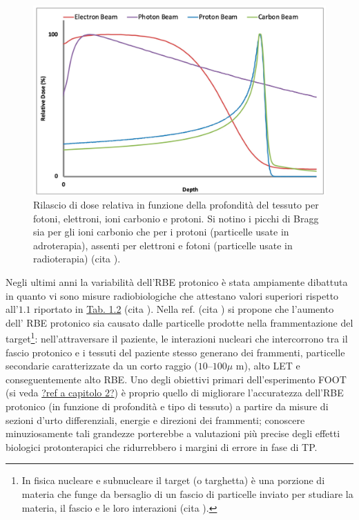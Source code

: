 \documentclass[12pt,a4paper,twoside]{report}
\begin{document}
	\begin{figure}[H]
		\centering
		\includegraphics[width=0.9\linewidth]{photon.jpg}
		\caption{Rilascio di dose relativa in funzione della profondità del tessuto per fotoni, elettroni, ioni carbonio e protoni. Si notino i picchi di Bragg sia per gli ioni carbonio che per i protoni (particelle usate in adroterapia), assenti per elettroni e fotoni (particelle usate in radioterapia) (cita
			).}
		\label{fig:photon}
	\end{figure}
	
	Negli ultimi anni la variabilità dell'RBE protonico è stata ampiamente dibattuta in quanto vi sono misure radiobiologiche che attestano valori superiori rispetto all'$1.1$ riportato in \hyperref[tab:let_rbe]{Tab. 1.2} (cita
	). Nella ref. (cita
	) si propone che l'aumento dell' RBE protonico sia causato dalle particelle prodotte nella frammentazione del target\footnote{In fisica nucleare e subnucleare il target (o targhetta) è una porzione di materia che funge da bersaglio di un fascio di particelle inviato per studiare la materia, il fascio e le loro interazioni (cita
		).}: nell'attraversare il paziente, le interazioni nucleari che intercorrono tra il fascio protonico e i tessuti del paziente stesso generano dei frammenti, particelle secondarie caratterizzate da un corto raggio ($10$--$100\mu\mbox{ m}$), alto LET e conseguentemente alto RBE. Uno degli obiettivi primari dell'esperimento FOOT (si veda \hyperref[ref a capitolo 2]{?ref a capitolo 2?}) è proprio quello di migliorare l'accuratezza dell'RBE protonico (in funzione di profondità e tipo di tessuto) a partire da misure di sezioni d'urto differenziali, energie e direzioni dei frammenti; conoscere minuziosamente tali grandezze porterebbe a valutazioni più precise degli effetti biologici protonterapici che ridurrebbero i margini di errore in fase di TP.
		
\end{document}
